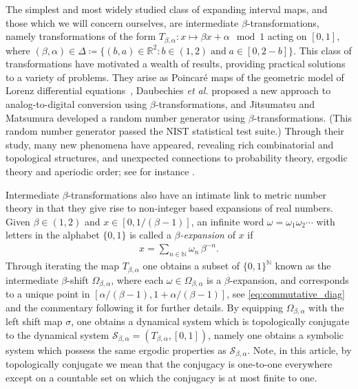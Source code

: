 \documentclass[a4paper,reqno,10pt]{amsart}
\begin{document}
The simplest and most widely studied class of expanding interval maps, and those which we will concern ourselves, are intermediate $\beta$-transformations, namely transformations of the form $T_{\beta, \alpha} : x \mapsto \beta x + \alpha\mod 1$ acting on $[0,1]$, where $(\beta, \alpha) \in \Delta \coloneqq \{ (b, a) \in \mathbb{R}^{2} \colon b \in (1, 2) \; \text{and} \; a \in [0, 2-b]\}$. This class of transformations have motivated a wealth of results, providing practical solutions to a variety of problems.  They arise as Poincar\'e maps of the geometric model of Lorenz differential equations~\cite{MR681294}, Daubechies \textsl{et al.} \cite{1011470} proposed a new approach to analog-to-digital conversion using \mbox{$\beta$-transformations}, and Jitsumatsu and Matsumura \cite{Jitsumatsu2016AT} developed a random number generator using \mbox{$\beta$-transformations}.  (This random number generator passed the NIST statistical test suite.)  Through their study, many new phenomena have appeared, revealing rich combinatorial and topological structures, and unexpected connections to probability theory, ergodic theory and aperiodic order; see for instance \cite{bezuglyi_kolyada_2003,Komornik:2011,ArneThesis}.

Intermediate $\beta$-transformations also have an intimate link to metric number theory in that they give rise to \mbox{non-integer} based expansions of real numbers. Given $\beta \in (1, 2)$ and $x \in [0, 1/(\beta-1)]$, an infinite word $\omega = \omega_{1}\omega_{2}\cdots$ with letters in the alphabet $\{0, 1\}$ is called a \textsl{$\beta$-expansion} of $x$ if
    \begin{align*}
        x = \sum_{n \in \mathbb{N}} \omega_{n} \, \beta^{-n}.
    \end{align*}
Through iterating the map $T_{\beta, \alpha}$ one obtains a subset of $\{ 0, 1\}^{\mathbb{N}}$ known as the intermediate $\beta$-shift $\Omega_{\beta, \alpha}$, where each $\omega \in \Omega_{\beta, \alpha}$ is a $\beta$-expansion, and corresponds to a unique point in $[\alpha/(\beta-1), 1+\alpha/(\beta-1)]$, see \eqref{eq:commutative_diag} and the commentary following it for further details. By equipping $\Omega_{\beta, \alpha}$ with the left shift map $\sigma$, one obtains a dynamical system which is topologically conjugate to the dynamical system $\mathcal{S}_{\beta,\alpha}=(T_{\beta, \alpha}, [0, 1])$, namely one obtains a symbolic system which possess the same ergodic properties as $\mathcal{S}_{\beta,\alpha}$. Note, in this article, by topologically conjugate we mean that the conjugacy is one-to-one everywhere except on a countable set on which the conjugacy is at most finite to one.
\end{document}
